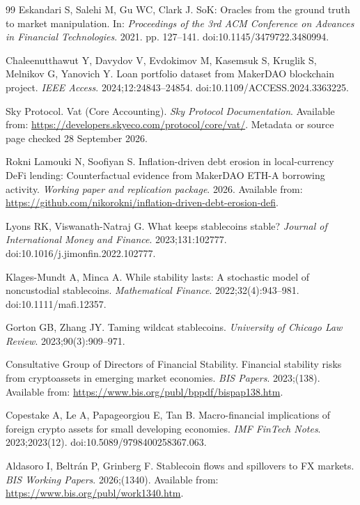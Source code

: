 \begin{thebibliography}{99}
Eskandari S, Salehi M, Gu WC, Clark J.
SoK: Oracles from the ground truth to market manipulation.
In: \textit{Proceedings of the 3rd ACM Conference on Advances in Financial Technologies}. 2021. pp. 127--141.
doi:10.1145/3479722.3480994.

Chaleenutthawut Y, Davydov V, Evdokimov M, Kasemsuk S, Kruglik S, Melnikov G, Yanovich Y.
Loan portfolio dataset from MakerDAO blockchain project.
\textit{IEEE Access}. 2024;12:24843--24854.
doi:10.1109/ACCESS.2024.3363225.

Sky Protocol.
Vat (Core Accounting).
\textit{Sky Protocol Documentation}.
Available from: \url{https://developers.skyeco.com/protocol/core/vat/}. Metadata or source page checked 28 September 2026.

Rokni Lamouki N, Soofiyan S.
Inflation-driven debt erosion in local-currency DeFi lending: Counterfactual evidence from MakerDAO ETH-A borrowing activity.
\textit{Working paper and replication package}. 2026.
Available from: \url{https://github.com/nikorokni/inflation-driven-debt-erosion-defi}.

Lyons RK, Viswanath-Natraj G.
What keeps stablecoins stable?
\textit{Journal of International Money and Finance}. 2023;131:102777.
doi:10.1016/j.jimonfin.2022.102777.

Klages-Mundt A, Minca A.
While stability lasts: A stochastic model of noncustodial stablecoins.
\textit{Mathematical Finance}. 2022;32(4):943--981.
doi:10.1111/mafi.12357.

Gorton GB, Zhang JY.
Taming wildcat stablecoins.
\textit{University of Chicago Law Review}. 2023;90(3):909--971.

Consultative Group of Directors of Financial Stability.
Financial stability risks from cryptoassets in emerging market economies.
\textit{BIS Papers}. 2023;(138).
Available from: \url{https://www.bis.org/publ/bppdf/bispap138.htm}.

Copestake A, Le A, Papageorgiou E, Tan B.
Macro-financial implications of foreign crypto assets for small developing economies.
\textit{IMF FinTech Notes}. 2023;2023(12).
doi:10.5089/9798400258367.063.

Aldasoro I, Beltr\'an P, Grinberg F.
Stablecoin flows and spillovers to FX markets.
\textit{BIS Working Papers}. 2026;(1340).
Available from: \url{https://www.bis.org/publ/work1340.htm}.


\end{thebibliography}
